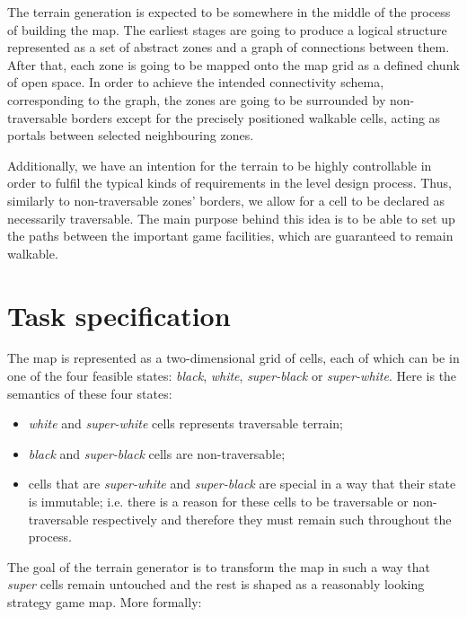 \documentclass[a4paper, 11pt]{article} %
\begin{document}
The terrain generation is expected to be somewhere in the middle of the process of building the map. The earliest stages are going to produce a logical structure represented as a set of abstract zones and a graph of connections between them. After that, each zone is going to be mapped onto the map grid as a defined chunk of open space. In order to achieve the intended connectivity schema, corresponding to the graph, the zones are going to be surrounded by non-traversable borders except for the precisely positioned walkable cells, acting as portals between selected neighbouring zones. 

Additionally, we have an intention for the terrain to be highly controllable in order to fulfil the typical kinds of requirements in the level design process. Thus, similarly to non-traversable zones' borders, we allow for a cell to be declared as necessarily traversable. The main purpose behind this idea is to be able to set up the paths between the important game facilities, which are guaranteed to remain walkable.


\section*{Task specification}

The map is represented as a two-dimensional grid of cells, each of which can be in one of the four feasible states: \emph{black}, \emph{white}, \emph{super-black} or \emph{super-white}. Here is the semantics of these four states:

\begin{itemize}
	\item \emph{white} and \emph{super-white} cells represents traversable terrain;
	\item \emph{black} and \emph{super-black} cells are non-traversable;
	\item cells that are \emph{super-white} and \emph{super-black} are special in a way that their state is immutable; i.e. there is a reason for these cells to be traversable or non-traversable respectively and therefore they must remain such throughout the process.
\end{itemize}

The goal of the terrain generator is to transform the map in such a way that \emph{super} cells remain untouched and the rest is shaped as a reasonably looking strategy game map. More formally:
\end{document}

